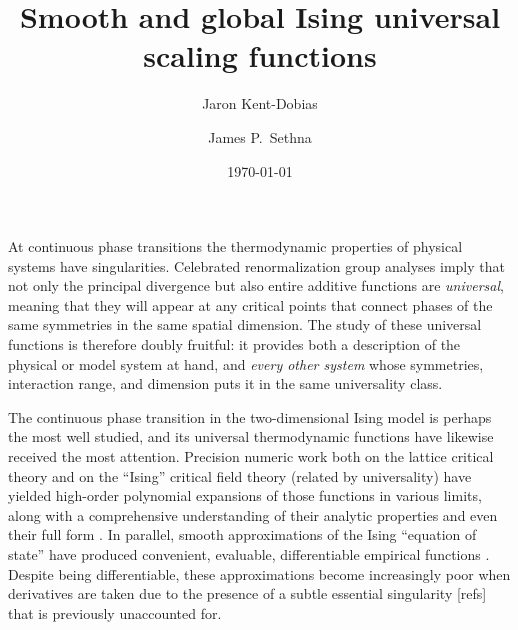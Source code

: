 \documentclass[
  aps,
  pre,
  reprint,
  longbibliography,
  floatfix
]{revtex4-2}
\begin{document}
\title{Smooth and global Ising universal scaling functions}

\author{Jaron Kent-Dobias}

\author{James P.~Sethna}

\date\today

\begin{abstract}
\end{abstract}

\maketitle

At continuous phase transitions the thermodynamic properties of physical
systems have singularities. Celebrated renormalization group analyses imply
that not only the principal divergence but also entire additive functions are
\emph{universal}, meaning that they will appear at any critical points that
connect phases of the same symmetries in the same spatial dimension. The study
of these universal functions is therefore doubly fruitful: it provides both a
description of the physical or model system at hand, and \emph{every other
system} whose symmetries, interaction range, and dimension puts it in the same
universality class.

The continuous phase transition in the two-dimensional Ising model is perhaps
the most well studied, and its universal thermodynamic functions have likewise
received the most attention. Precision numeric work both on the lattice
critical theory and on the ``Ising'' critical field theory (related by
universality) have yielded high-order polynomial expansions of those functions
in various limits, along with a comprehensive understanding of their analytic
properties and even their full form \cite{Fonseca_2003_Ising, Mangazeev_2008_Variational, Mangazeev_2010_Scaling}. In parallel, smooth approximations of the
Ising ``equation of state'' have produced convenient, evaluable, differentiable
empirical functions \cite{Guida_1997_3D, Campostrini_2000_Critical, Caselle_2001_The}. Despite being differentiable, these approximations become
increasingly poor when derivatives are taken due to the presence of a subtle
essential singularity [refs] that is previously unaccounted for.
\end{document}
